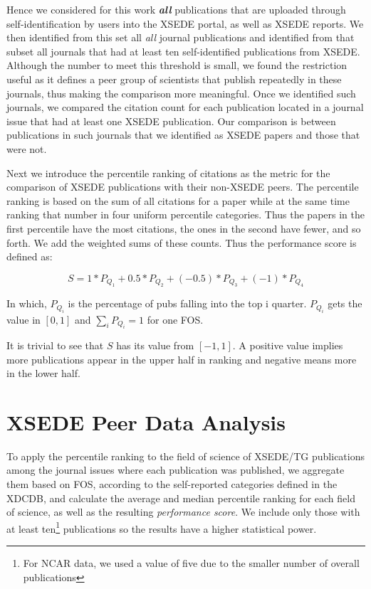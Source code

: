 \documentclass[10pt, conference, compsocconf]{IEEEtran}
\begin{document}
Hence we considered for this work {\em\bf all} publications that are uploaded through self-identification by users into the XSEDE portal, as well as XSEDE reports. We then identified from this set all {\em all} journal publications and identified from that subset all journals that had at least ten self-identified publications from XSEDE. Although the number to meet this threshold is small, we found the restriction useful as it defines a peer group of scientists that publish repeatedly in these journals, thus making the comparison more meaningful. Once we identified such journals, we compared the citation count for each publication located in a journal issue that had at least one XSEDE publication. Our comparison is between publications in such journals that we identified as XSEDE papers and those that were not. 

Next we introduce the percentile ranking of citations as the metric for the comparison of XSEDE publications with their non-XSEDE peers. The percentile ranking is based on the sum of all citations for a paper while at the same time ranking that number in four uniform percentile categories. Thus the papers in the first percentile have the most citations, the ones in the second have fewer, and so forth.  We add the weighted sums of these counts. Thus the performance score is defined as:

\[	S = 1*P_{Q_1} + 0.5*P_{Q_2}+ (-0.5)*P_{Q_3} + (-1)*P_{Q_4} \]

In which, $P_{Q_i}$ is the percentage of pubs falling into the top i quarter. $P_{Q_i}$ gets the value in $[0,1]$ and $\sum_{i} {P_{Q_i}} = 1$ for one FOS.

It is trivial to see that $S$ has its value from $[-1, 1]$. A positive value implies more publications appear in the upper half in ranking and negative means more in the lower half.

\section{XSEDE Peer Data Analysis}
\label{S:xsede}

To apply the percentile ranking to the field of science of XSEDE/TG publications among the journal issues where each publication was published, we aggregate them based on FOS, according to the self-reported categories defined in the XDCDB, and calculate the average and median percentile ranking for each field of science, as well as the resulting  \emph{performance score}. We include only those with at least ten\footnote{For NCAR data, we used a value of five due to the smaller number of overall publications} publications so the results have a higher statistical power. 
\end{document}
